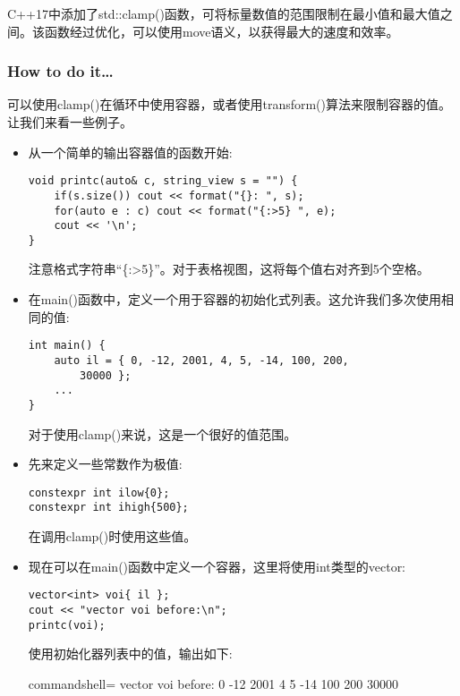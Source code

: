 
C++17中添加了std::clamp()函数，可将标量数值的范围限制在最小值和最大值之间。该函数经过优化，可以使用move语义，以获得最大的速度和效率。

\subsubsection{How to do it…}

可以使用clamp()在循环中使用容器，或者使用transform()算法来限制容器的值。让我们来看一些例子。

\begin{itemize}
\item 
从一个简单的输出容器值的函数开始:

\begin{lstlisting}[style=styleCXX]
void printc(auto& c, string_view s = "") {
	if(s.size()) cout << format("{}: ", s);
	for(auto e : c) cout << format("{:>5} ", e);
	cout << '\n';
}
\end{lstlisting}

注意格式字符串“\{:>5\}”。对于表格视图，这将每个值右对齐到5个空格。

\item 
在main()函数中，定义一个用于容器的初始化式列表。这允许我们多次使用相同的值:

\begin{lstlisting}[style=styleCXX]
int main() {
	auto il = { 0, -12, 2001, 4, 5, -14, 100, 200,
		30000 };
	...
}
\end{lstlisting}

对于使用clamp()来说，这是一个很好的值范围。

\item 
先来定义一些常数作为极值:

\begin{lstlisting}[style=styleCXX]
constexpr int ilow{0};
constexpr int ihigh{500};
\end{lstlisting}

在调用clamp()时使用这些值。

\item 
现在可以在main()函数中定义一个容器，这里将使用int类型的vector:

\begin{lstlisting}[style=styleCXX]
vector<int> voi{ il };
cout << "vector voi before:\n";
printc(voi);
\end{lstlisting}

使用初始化器列表中的值，输出如下:

\begin{tcblisting}{commandshell={}}
vector voi before:
0 -12 2001 4 5 -14 100 200 30000
\end{tcblisting}


\end{itemize}
